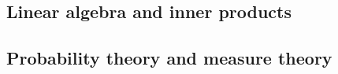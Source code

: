 
\subsection{Linear algebra and inner products}




\subsection{Probability theory and measure theory}



